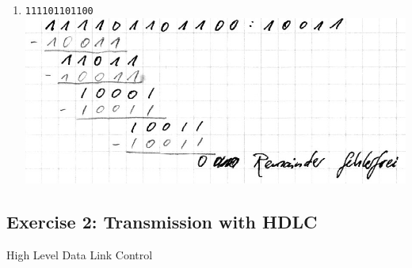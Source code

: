 \documentclass[10pt,a4paper]{scrartcl}
\begin{document}
\begin{enumerate}
\item \texttt{111101101100}\\
\includegraphics{a4e1_3.jpg}
\end{enumerate}

\subsection*{Exercise 2: Transmission with HDLC}
High Level Data Link Control\\
\end{document}
